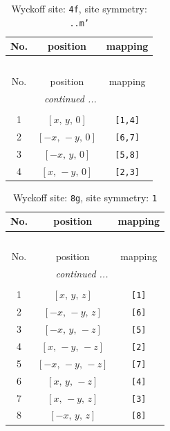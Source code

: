 \documentclass[fleqn,8pt]{jsarticle}
\begin{document}
\begin{longtable}{ccc}
\caption{Wyckoff site: {\tt 4f}, site symmetry: {\tt ..m'}}
 \\
 \hline \hline
No. & position & mapping \\ \hline \endfirsthead

\multicolumn{2}{l}{\tablename\ \thetable{}} \\
 \hline \hline
No. & position & mapping \\ \hline \endhead

 \hline \hline
\multicolumn{2}{r}{\footnotesize\it continued ...} \\ \endfoot

 \hline \hline
\multicolumn{2}{r}{} \\ \endlastfoot

1 & $\left[ x,\, y,\, 0 \right]$ & {\tt [1,4]} \\ \hline
2 & $\left[ - x,\, - y,\, 0 \right]$ & {\tt [6,7]} \\ \hline
3 & $\left[ - x,\, y,\, 0 \right]$ & {\tt [5,8]} \\ \hline
4 & $\left[ x,\, - y,\, 0 \right]$ & {\tt [2,3]} \\
\end{longtable}
\renewcommand{\arraystretch}{1.2}
\begin{longtable}{ccc}
\caption{Wyckoff site: {\tt 8g}, site symmetry: {\tt 1}}
 \\
 \hline \hline
No. & position & mapping \\ \hline \endfirsthead

\multicolumn{2}{l}{\tablename\ \thetable{}} \\
 \hline \hline
No. & position & mapping \\ \hline \endhead

 \hline \hline
\multicolumn{2}{r}{\footnotesize\it continued ...} \\ \endfoot

 \hline \hline
\multicolumn{2}{r}{} \\ \endlastfoot

1 & $\left[ x,\, y,\, z \right]$ & {\tt [1]} \\ \hline
2 & $\left[ - x,\, - y,\, z \right]$ & {\tt [6]} \\ \hline
3 & $\left[ - x,\, y,\, - z \right]$ & {\tt [5]} \\ \hline
4 & $\left[ x,\, - y,\, - z \right]$ & {\tt [2]} \\ \hline
5 & $\left[ - x,\, - y,\, - z \right]$ & {\tt [7]} \\ \hline
6 & $\left[ x,\, y,\, - z \right]$ & {\tt [4]} \\ \hline
7 & $\left[ x,\, - y,\, z \right]$ & {\tt [3]} \\ \hline
8 & $\left[ - x,\, y,\, z \right]$ & {\tt [8]} \\
\end{longtable}
\end{document}
